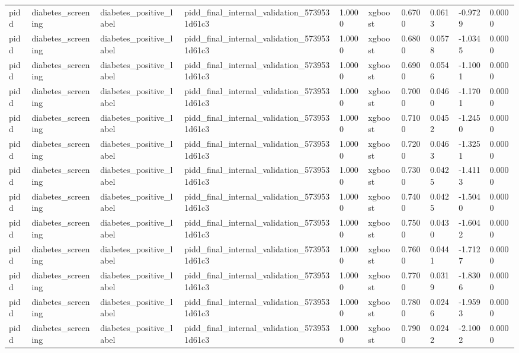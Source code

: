 \begin{tabular}{llllllllll}
pidd & diabetes\_screening & diabetes\_positive\_label & pidd\_final\_internal\_validation\_5739531d61c3 & 1.0000 & xgboost & 0.6700 & 0.0613 & -0.9729 & 0.0000 \\
pidd & diabetes\_screening & diabetes\_positive\_label & pidd\_final\_internal\_validation\_5739531d61c3 & 1.0000 & xgboost & 0.6800 & 0.0578 & -1.0345 & 0.0000 \\
pidd & diabetes\_screening & diabetes\_positive\_label & pidd\_final\_internal\_validation\_5739531d61c3 & 1.0000 & xgboost & 0.6900 & 0.0546 & -1.1001 & 0.0000 \\
pidd & diabetes\_screening & diabetes\_positive\_label & pidd\_final\_internal\_validation\_5739531d61c3 & 1.0000 & xgboost & 0.7000 & 0.0460 & -1.1701 & 0.0000 \\
pidd & diabetes\_screening & diabetes\_positive\_label & pidd\_final\_internal\_validation\_5739531d61c3 & 1.0000 & xgboost & 0.7100 & 0.0452 & -1.2450 & 0.0000 \\
pidd & diabetes\_screening & diabetes\_positive\_label & pidd\_final\_internal\_validation\_5739531d61c3 & 1.0000 & xgboost & 0.7200 & 0.0463 & -1.3251 & 0.0000 \\
pidd & diabetes\_screening & diabetes\_positive\_label & pidd\_final\_internal\_validation\_5739531d61c3 & 1.0000 & xgboost & 0.7300 & 0.0425 & -1.4113 & 0.0000 \\
pidd & diabetes\_screening & diabetes\_positive\_label & pidd\_final\_internal\_validation\_5739531d61c3 & 1.0000 & xgboost & 0.7400 & 0.0425 & -1.5040 & 0.0000 \\
pidd & diabetes\_screening & diabetes\_positive\_label & pidd\_final\_internal\_validation\_5739531d61c3 & 1.0000 & xgboost & 0.7500 & 0.0430 & -1.6042 & 0.0000 \\
pidd & diabetes\_screening & diabetes\_positive\_label & pidd\_final\_internal\_validation\_5739531d61c3 & 1.0000 & xgboost & 0.7600 & 0.0441 & -1.7127 & 0.0000 \\
pidd & diabetes\_screening & diabetes\_positive\_label & pidd\_final\_internal\_validation\_5739531d61c3 & 1.0000 & xgboost & 0.7700 & 0.0319 & -1.8306 & 0.0000 \\
pidd & diabetes\_screening & diabetes\_positive\_label & pidd\_final\_internal\_validation\_5739531d61c3 & 1.0000 & xgboost & 0.7800 & 0.0246 & -1.9593 & 0.0000 \\
pidd & diabetes\_screening & diabetes\_positive\_label & pidd\_final\_internal\_validation\_5739531d61c3 & 1.0000 & xgboost & 0.7900 & 0.0242 & -2.1002 & 0.0000 \\

\end{tabular}
